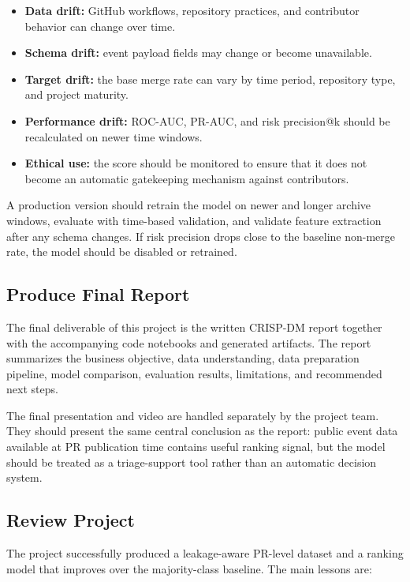\begin{itemize}
    \item \textbf{Data drift:} GitHub workflows, repository practices, and contributor behavior can change over time.
    \item \textbf{Schema drift:} event payload fields may change or become unavailable.
    \item \textbf{Target drift:} the base merge rate can vary by time period, repository type, and project maturity.
    \item \textbf{Performance drift:} ROC-AUC, PR-AUC, and risk precision@k should be recalculated on newer
        time windows.
    \item \textbf{Ethical use:} the score should be monitored to ensure that it does not become an automatic
        gatekeeping mechanism against contributors.
\end{itemize}

A production version should retrain the model on newer and longer archive windows, evaluate with time-based
validation, and validate feature extraction after any schema changes. If risk precision drops close to the
baseline non-merge rate, the model should be disabled or retrained.

\subsection{Produce Final Report}

The final deliverable of this project is the written CRISP-DM report together with the accompanying code
notebooks and generated artifacts. The report summarizes the business objective, data understanding, data
preparation pipeline, model comparison, evaluation results, limitations, and recommended next steps.

The final presentation and video are handled separately by the project team. They should present the same
central conclusion as the report: public event data available at PR publication time contains useful ranking
signal, but the model should be treated as a triage-support tool rather than an automatic decision system.

\subsection{Review Project}

The project successfully produced a leakage-aware PR-level dataset and a ranking model that improves over the
majority-class baseline. The main lessons are:

